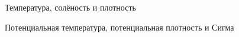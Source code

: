 \begin{chapter}{Температура, солёность и плотность}
\begin{section}{Потенциальная температура, потенциальная плотность и Сигма}
%
%
%


\end{section}
\end{chapter}
